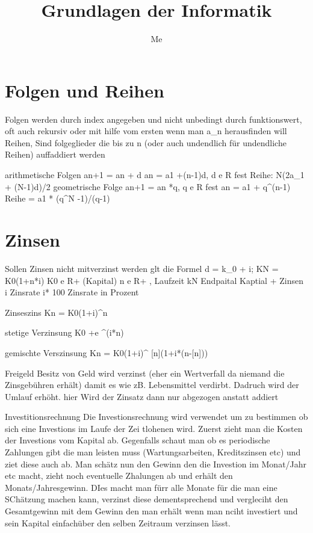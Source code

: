\documentclass[a4paper]{scrartcl}
\author{Me}
\title{Grundlagen der Informatik}
\begin{document}
    \maketitle
    \newpage
    \tableofcontents
    \newpage

    


    \section{Folgen und Reihen}
    Folgen
        werden durch index angegeben und nicht unbedingt durch funktionswert, oft auch rekursiv oder mit hilfe vom ersten wenn man a_n herausfinden will
    Reihen,
        Sind folgeglieder die bis zu n (oder auch undendlich für undendliche Reihen) auffaddiert werden

    arithmetische Folgen
        an+1 = an + d
        an = a1 +(n-1)d, d e R fest
        Reihe: N(2a_1 + (N-1)d)/2
    geometrische Folge 
        an+1 = an *q, q e R fest
        an = a1 + q^(n-1)
        Reihe = a1 * (q^N -1)/(q-1)
    
    \section{Zinsen}
        Sollen Zinsen nicht mitverzinst werden glt die Formel 
        d = k_0 + i; KN = K0(1+n*i)
        K0 e R+ (Kapital)
        n e R+ , Laufzeit 
        kN Endpaital Kaptial + Zinsen
        i Zinsrate
        i* 100 Zinsrate in Prozent

        Zinseszins
        Kn = K0(1+i)^n

        stetige Verzinsung
        K0 +e ^(i*n)

        gemischte Verszinsung
        Kn = K0(1+i)^ [n](1+i*(n-[n]))
        
        Freigeld
        Besitz von Geld wird verzinst (eher ein Wertverfall da niemand die Zinsgebühren erhält) damit es wie zB. Lebensmittel verdirbt. Dadruch wird der Umlauf erhöht.
        hier Wird der Zinsatz dann nur abgezogen anstatt addiert 

        Investitionsrechnung
        Die Investionsrechnung wird verwendet um zu bestimmen ob sich eine Investions im Laufe der Zei tlohenen wird. Zuerst zieht man die Kosten der Investions vom Kapital ab.
        Gegenfalls schaut man ob es periodische Zahlungen gibt die man leisten muss (Wartungsarbeiten, Kreditszinsen etc) und ziet diese auch ab. Man schätz nun den Gewinn den die Investion im Monat/Jahr etc
        macht, zieht noch eventuelle Zhalungen ab und erhält den Monats/Jahresgewinn. DIes macht man fürr alle Monate für die man eine SChätzung machen kann, verzinst diese dementsprechend und vergleciht den 
        Gesamtgewinn mit dem Gewinn den man erhält wenn man nciht investiert und sein Kapital einfachüber den selben Zeitraum verzinsen lässt.
\end{document}
